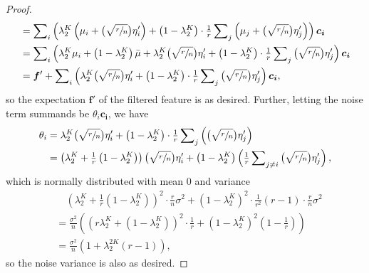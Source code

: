 \documentclass{article}
\begin{document}
\begin{proof}
\begin{align*}
    &= \sum\nolimits_i \left( \lambda_2^K \left( \mu_i   + \big( \sqrt{\sfrac{r}{n}} \big) \eta'_i \right) +  \left( 1 - \lambda_2^K \right) \cdot \tfrac{1}{r} \sum\nolimits_j \left( \mu_j   + \big( \sqrt{\sfrac{r}{n}} \big) \eta'_j \right) \right) \bm{c_i} \\
    &= \sum\nolimits_i \left( \lambda_2^K \mu_i  + \left( 1 - \lambda_2^K \right) \bar{\mu} 
    + \lambda_2^K \big( \sqrt{\sfrac{r}{n}} \big) \eta'_i + \left( 1 - \lambda_2^K \right) \cdot \tfrac{1}{r} \sum\nolimits_j \big( \sqrt{\sfrac{r}{n}} \big) \eta'_j \right) \bm{c_i} \\
    &= \bm{f}' + \sum\nolimits_i \left( \lambda_2^K \big( \sqrt{\sfrac{r}{n}} \big) \eta'_i + \left( 1 - \lambda_2^K \right) \cdot \tfrac{1}{r} \sum\nolimits_j \big( \sqrt{\sfrac{r}{n}} \big) \eta'_j \right)  \bm{c_i},
\end{align*}
%
so the expectation $\bm{f}'$ of the filtered feature is as desired. Further, letting the noise term summands be $\theta_i \bm{c_i}$, we have
\begin{align*}
    \theta_i &= \lambda_2^K \big( \sqrt{\sfrac{r}{n}} \big) \eta'_i + \left( 1 - \lambda_2^K \right) \cdot \tfrac{1}{r} \sum\nolimits_j \left( \big( \sqrt{\sfrac{r}{n}} \big) \eta'_j \right) \\
    &= \left( \lambda_2^K + \tfrac{1}{r} \left( 1 - \lambda_2^K \right) \right) \big( \sqrt{\sfrac{r}{n}} \big) \eta'_i + \left( 1 - \lambda_2^K \right) \left( \tfrac{1}{r} \sum\nolimits_{j\neq i} \big( \sqrt{\sfrac{r}{n}} \big) \eta'_j \right), 
\end{align*}
%
which is normally distributed with mean $0$ and variance
%
\begin{align*}
    &\quad \left( \lambda_2^K + \tfrac{1}{r} \left( 1 - \lambda_2^K \right) \right)^2 \cdot \tfrac{r}{n} \sigma^2 + \left(1 - \lambda_2^K \right)^2 \cdot \tfrac{1}{r^2} (r-1) \cdot \tfrac{r}{n} \sigma^2 \\
    &= \tfrac{\sigma^2}{n} \left( \left( r \lambda_2^K + \left( 1-\lambda_2^K \right) \right)^2 \cdot \tfrac{1}{r} + \left( 1-\lambda_2^K \right)^2 \left(1 - \tfrac{1}{r} \right) \right) \\
    &= \tfrac{\sigma^2}{n} \left(1 + \lambda_2^{2K} (r-1) \right),
\end{align*}
%
so the noise variance is also as desired.
\end{proof}
\end{document}
